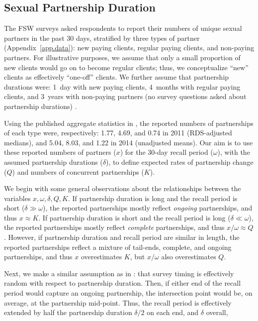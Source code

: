 \subsection{Sexual Partnership Duration}\label{meth.partners}
The FSW surveys asked respondents to report
their numbers of unique sexual partners in the past 30 days,
stratified by three types of partner (Appendix~\ref{app.data}):
new paying clients, regular paying clients, and non-paying partners.
For illustrative purposes, we assume that
only a small proportion of new clients would go on to become regular clients;
thus, we conceptualize ``new'' clients as effectively ``one-off'' clients.
We further assume that partnership durations were:
1~day with new paying clients,
4~months with regular paying clients, and
3~years with non-paying partners 
(no survey questions asked about partnership durations) \cite{?}.
\par
Using the published aggregate statistics in \cite{Baral2014,EswKP2014},
the reported numbers of partnerships of each type were, respectively:
1.77, 4.69, and 0.74 in 2011 (RDS-adjusted medians), and
5.04, 8.03, and 1.22 in 2014 (unadjusted means).
Our aim is to use these reported numbers of partners ($x$)
for the 30-day recall period ($\omega$),
with the assumed partnership durations ($\delta$),
to define expected rates of partnership change ($Q$) and numbers of concurrent partnerships ($K$).
\par
We begin with some general observations about
the relationships between the variables $x, \omega, \delta, Q, K$.
If partnership duration is long and the recall period is short ($\delta \gg \omega$),
the reported partnerships mostly reflect \emph{ongoing} partnerships,
and thus $x \approx K$.
If partnership duration is short and the recall period is long ($\delta \ll \omega$),
the reported partnerships mostly reflect \emph{complete} partnerships,
and thus $x/\omega \approx Q$.
However, if partnership duration and recall period are similar in length,
the reported partnerships reflect a mixture of tail-ends, complete, and ongoing partnerships,
and thus $x$ overestimates $K$, but $x/\omega$ also overestimates $Q$.
\par
Next, we make a similar assumption as in :
that survey timing is effectively random with respect to partnership duration.
Then, if either end of the recall period would capture an ongoing partnership,
the intersection point would be, on average, at the partnership mid-point.
Thus, the recall period is effectively extended
by half the partnership duration $\delta/2$ on each end, and $\delta$ overall,

